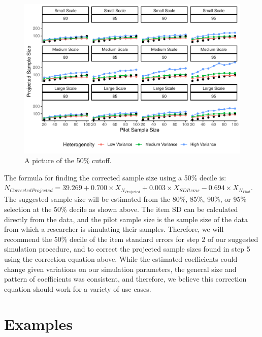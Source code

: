 \documentclass[
  man]{apa6}
\begin{document}
\begin{figure}
\centering
\includegraphics{manuscript_draft_files/figure-latex/decile-figure-1.pdf}
\caption{\label{fig:decile-figure}A picture of the 50\% cutoff.}
\end{figure}

The formula for finding the corrected sample size using a 50\% decile is: \(N_{Corrected Projected} = 39.269 + 0.700 \times X_{N_{Projected}} + 0.003 \times X_{SD Items} - 0.694 \times X_{N_{Pilot}}\). The suggested sample size will be estimated from the 80\%, 85\%, 90\%, or 95\% selection at the 50\% decile as shown above. The item SD can be calculated directly from the data, and the pilot sample size is the sample size of the data from which a researcher is simulating their samples. Therefore, we will recommend the 50\% decile of the item standard errors for step 2 of our suggested simulation procedure, and to correct the projected sample sizes found in step 5 using the correction equation above. While the estimated coefficients could change given variations on our simulation parameters, the general size and pattern of coefficients was consistent, and therefore, we believe this correction equation should work for a variety of use cases.

\hypertarget{examples}{%
\section{Examples}\label{examples}}
\end{document}
